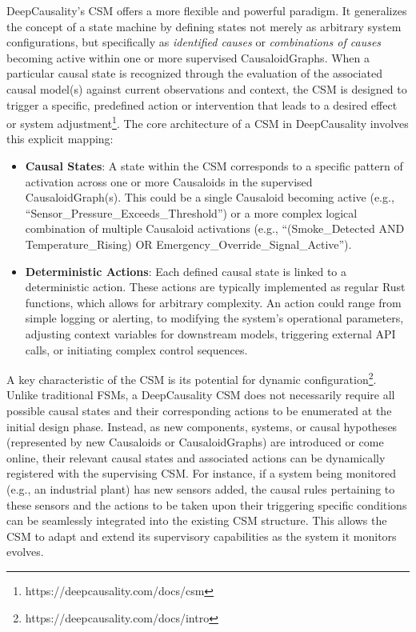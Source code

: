 DeepCausality's CSM offers a more flexible and powerful paradigm. It generalizes the concept of a state machine by defining states not merely as arbitrary system configurations, but specifically as \textit{identified causes} or \textit{combinations of causes} becoming active within one or more supervised CausaloidGraphs. When a particular causal state is recognized through the evaluation of the associated causal model(s) against current observations and context, the CSM is designed to trigger a specific, predefined action or intervention that leads to a desired effect or system adjustment\footnote{https://deepcausality.com/docs/csm}. The core architecture of a CSM in DeepCausality involves this explicit mapping:
\begin{itemize}
    \item \textbf{Causal States}: A state within the CSM corresponds to a specific pattern of activation across one or more Causaloids in the supervised CausaloidGraph(s). This could be a single Causaloid becoming active (e.g., ``Sensor\_Pressure\_Exceeds\_Threshold'') or a more complex logical combination of multiple Causaloid activations (e.g., ``(Smoke\_Detected AND Temperature\_Rising) OR Emergency\_Override\_Signal\_Active'').
    \item \textbf{Deterministic Actions}: Each defined causal state is linked to a deterministic action. These actions are typically implemented as regular Rust functions, which allows for arbitrary complexity. An action could range from simple logging or alerting, to modifying the system's operational parameters, adjusting context variables for downstream models, triggering external API calls, or initiating complex control sequences.
\end{itemize}
A key characteristic of the CSM is its potential for dynamic configuration\footnote{https://deepcausality.com/docs/intro}. Unlike traditional FSMs, a DeepCausality CSM does not necessarily require all possible causal states and their corresponding actions to be enumerated at the initial design phase. Instead, as new components, systems, or causal hypotheses (represented by new Causaloids or CausaloidGraphs) are introduced or come online, their relevant causal states and associated actions can be dynamically registered with the supervising CSM. For instance, if a system being monitored (e.g., an industrial plant) has new sensors added, the causal rules pertaining to these sensors and the actions to be taken upon their triggering specific conditions can be seamlessly integrated into the existing CSM structure. This allows the CSM to adapt and extend its supervisory capabilities as the system it monitors evolves. 

